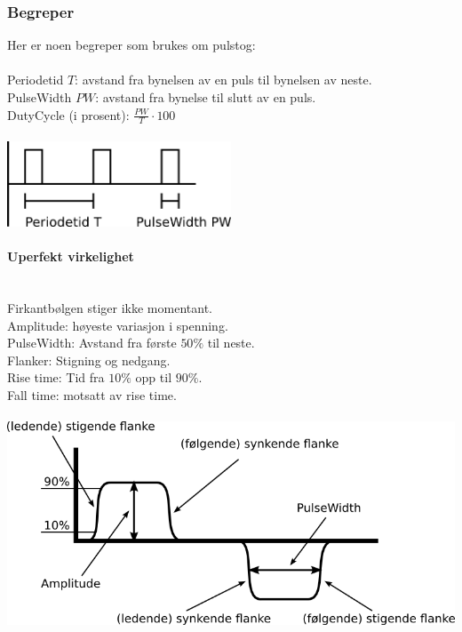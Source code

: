 \subsubsection{Begreper}
Her er noen begreper som brukes om pulstog:
\\\\
Periodetid $T$: avstand fra bynelsen av en puls til bynelsen av neste. \\
PulseWidth $PW$: avstand fra bynelse til slutt av en puls. \\
DutyCycle (i prosent): $\frac{PW}{T} \cdot 100$
\\\\
\includegraphics[width=0.5\textwidth]{./img/pulstog}

\paragraph{Uperfekt virkelighet} \mbox{} \\
Firkantbølgen stiger ikke momentant.\\
Amplitude: høyeste variasjon i spenning. \\
PulseWidth: Avstand fra første $50\%$ til neste. \\
Flanker: Stigning og nedgang. \\
Rise time: Tid fra $10\%$ opp til $90\%$. \\
Fall time: motsatt av rise time.
\\\\
\includegraphics[width=\textwidth]{./img/pulstog2}



